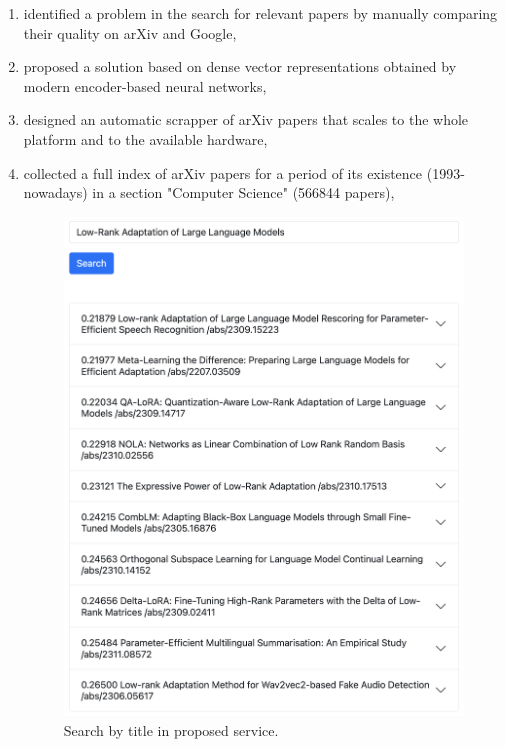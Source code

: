 \documentclass{article}
\begin{document}
        \begin{enumerate}
            \item identified a problem in the search for relevant papers by manually comparing their quality on arXiv and Google,
            \item proposed a solution based on dense vector representations obtained by modern encoder-based neural networks,
            \item designed an automatic scrapper of arXiv papers that scales to the whole platform and to the available hardware,
            \item collected a full index of arXiv papers for a period of its existence (1993-nowadays) in a section "Computer Science" (566844 papers),

            \begin{figure}[H]
                \centering
                \includegraphics[width=0.8\linewidth]{img/search_aziri.png}
                \caption{Search by title in proposed service.}
                \label{fig:aziri-search}
            \end{figure}


\end{enumerate}
\end{document}
